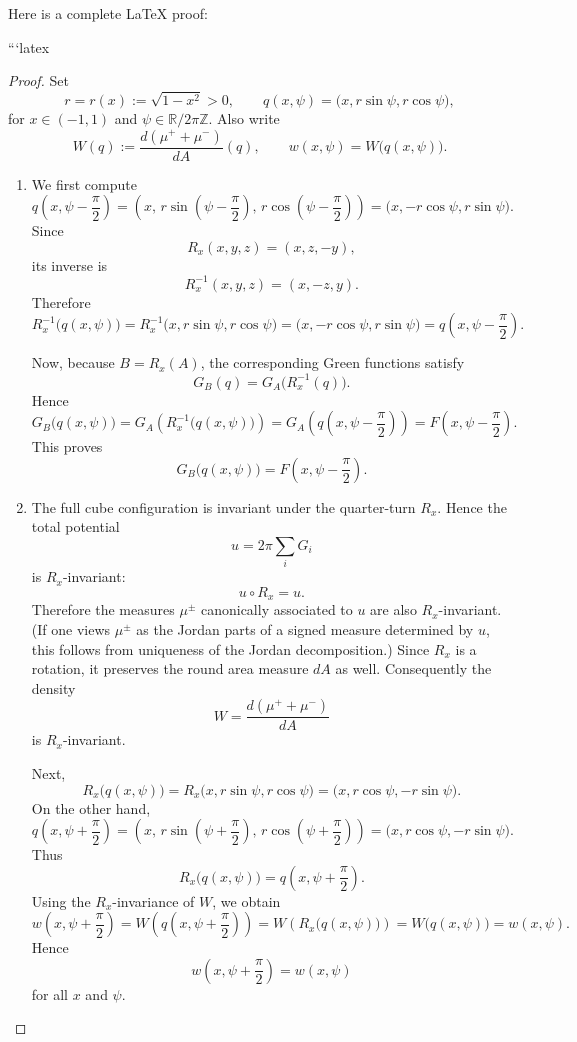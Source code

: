 Here is a complete LaTeX proof:

```latex
\begin{proof}
Set
\[
r=r(x):=\sqrt{1-x^2}>0,
\qquad
q(x,\psi)=\bigl(x,r\sin\psi,r\cos\psi\bigr),
\]
for $x\in(-1,1)$ and $\psi\in\mathbb{R}/2\pi\mathbb{Z}$.
Also write
\[
W(q):=\frac{d(\mu^++\mu^-)}{dA}(q),
\qquad
w(x,\psi)=W\bigl(q(x,\psi)\bigr).
\]

\begin{enumerate}
\item[(i)] We first compute
\[
q\!\left(x,\psi-\frac{\pi}{2}\right)
=
\left(
x,\,
r\sin\!\left(\psi-\frac{\pi}{2}\right),\,
r\cos\!\left(\psi-\frac{\pi}{2}\right)
\right)
=
\bigl(x,-r\cos\psi,r\sin\psi\bigr).
\]
Since
\[
R_x(x,y,z)=(x,z,-y),
\]
its inverse is
\[
R_x^{-1}(x,y,z)=(x,-z,y).
\]
Therefore
\[
R_x^{-1}\bigl(q(x,\psi)\bigr)
=
R_x^{-1}\bigl(x,r\sin\psi,r\cos\psi\bigr)
=
\bigl(x,-r\cos\psi,r\sin\psi\bigr)
=
q\!\left(x,\psi-\frac{\pi}{2}\right).
\]

Now, because $B=R_x(A)$, the corresponding Green functions satisfy
\[
G_B(q)=G_A\!\bigl(R_x^{-1}(q)\bigr).
\]
Hence
\[
G_B\bigl(q(x,\psi)\bigr)
=
G_A\!\left(R_x^{-1}\bigl(q(x,\psi)\bigr)\right)
=
G_A\!\left(q\!\left(x,\psi-\frac{\pi}{2}\right)\right)
=
F\!\left(x,\psi-\frac{\pi}{2}\right).
\]
This proves
\[
G_B\bigl(q(x,\psi)\bigr)=F\!\left(x,\psi-\frac{\pi}{2}\right).
\]

\item[(ii)] The full cube configuration is invariant under the quarter-turn $R_x$. Hence the total potential
\[
u=2\pi\sum_i G_i
\]
is $R_x$-invariant:
\[
u\circ R_x=u.
\]
Therefore the measures $\mu^\pm$ canonically associated to $u$ are also $R_x$-invariant. (If one views $\mu^\pm$ as the Jordan parts of a signed measure determined by $u$, this follows from uniqueness of the Jordan decomposition.) Since $R_x$ is a rotation, it preserves the round area measure $dA$ as well. Consequently the density
\[
W=\frac{d(\mu^++\mu^-)}{dA}
\]
is $R_x$-invariant.

Next,
\[
R_x\bigl(q(x,\psi)\bigr)
=
R_x\bigl(x,r\sin\psi,r\cos\psi\bigr)
=
\bigl(x,r\cos\psi,-r\sin\psi\bigr).
\]
On the other hand,
\[
q\!\left(x,\psi+\frac{\pi}{2}\right)
=
\left(
x,\,
r\sin\!\left(\psi+\frac{\pi}{2}\right),\,
r\cos\!\left(\psi+\frac{\pi}{2}\right)
\right)
=
\bigl(x,r\cos\psi,-r\sin\psi\bigr).
\]
Thus
\[
R_x\bigl(q(x,\psi)\bigr)=q\!\left(x,\psi+\frac{\pi}{2}\right).
\]
Using the $R_x$-invariance of $W$, we obtain
\[
w\!\left(x,\psi+\frac{\pi}{2}\right)
=
W\!\left(q\!\left(x,\psi+\frac{\pi}{2}\right)\right)
=
W\!\left(R_x\bigl(q(x,\psi)\bigr)\right)
=
W\bigl(q(x,\psi)\bigr)
=
w(x,\psi).
\]
Hence
\[
w\!\left(x,\psi+\frac{\pi}{2}\right)=w(x,\psi)
\]
for all $x$ and $\psi$.


\end{enumerate}
\end{proof}
